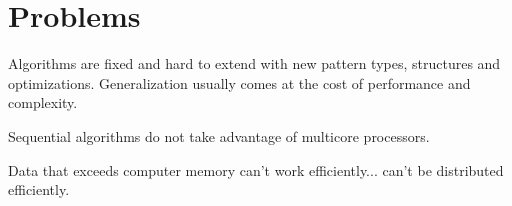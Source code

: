 \cite{CombinatorialSubtle, SurveyDNAMotif, SurveyMotifDiscovery}


\section{Problems}

\WIP

Algorithms are fixed and hard to extend with new pattern types, structures and optimizations. Generalization usually comes at the cost of performance and complexity. 

Sequential algorithms do not take advantage of multicore processors. 

Data that exceeds computer memory can't work efficiently... can't be distributed efficiently. 